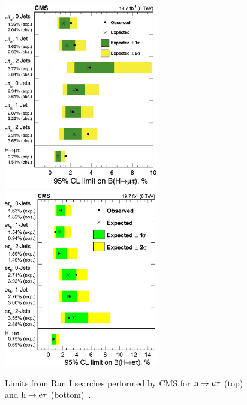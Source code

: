 \begin{figure}[hbtp]
 \begin{center}
   \includegraphics[width=0.6\textwidth]{plots_and_figures/chapter2/mutau_limits.jpg}\\
   \includegraphics[width=0.6\textwidth]{plots_and_figures/chapter2/etau_limits.jpg}
   \caption{Limits from Run I searches performed by CMS for $\text{h} \to \mu \tau$ (top) and $\text{h} \to \text{e} \tau$ (bottom)~\cite{Khachatryan:2015kon,HIG-14-040}.}
   \label{fig:8tev_limits}
 \end{center}
\end{figure}


